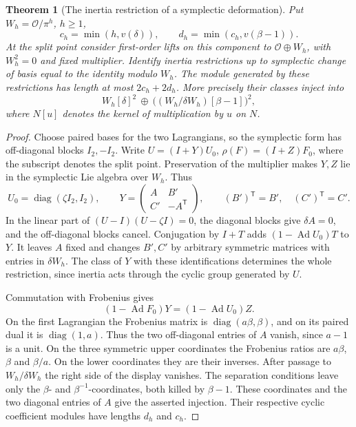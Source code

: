 \documentclass[a4paper,11pt]{article}
\newtheorem{theorem}[proposition]{Theorem}
\theoremstyle{definition}
\theoremstyle{remark}
\numberwithin{equation}{section}
\begin{document}
\begin{theorem}[The inertia restriction of a symplectic deformation]
\leavevmode\label{thm:symplocal655}
Put \(W_h=\mathcal O/\pi^h\), \(h\ge1\),
\[
 c_h=\min(h,v(\delta)),\qquad
 d_h=\min(c_h,v(\beta-1)).
\]
At the split point consider first-order lifts on this component
to \(\mathcal O\oplus W_h\), with \(W_h^2=0\) and fixed multiplier.
Identify inertia restrictions up to symplectic change of basis
equal to the identity modulo \(W_h\). The module generated by
these restrictions has length at most \(2c_h+2d_h\). More
precisely their classes inject into
\[
 W_h[\delta]^2\ \oplus\
       \big((W_h/\delta W_h)[\beta-1]\big)^2 ,
\]
where \(N[u]\) denotes the kernel of multiplication by \(u\) on \(N\).
\end{theorem}
\begin{proof}
Choose paired bases for the two Lagrangians, so the symplectic form
has off-diagonal blocks \(I_2,-I_2\). Write
\(U=(I+Y)U_0\), \(\rho(F)=(I+Z)F_0\), where the subscript denotes
the split point. Preservation of the multiplier makes \(Y,Z\)
lie in the symplectic Lie algebra over \(W_h\). Thus
\[
 U_0=\operatorname{diag}(\zeta I_2,I_2),\qquad
 Y=\begin{pmatrix} A&B'\\ C'&-A^{\mathsf T}\end{pmatrix},
 \qquad (B')^{\mathsf T}=B',\quad (C')^{\mathsf T}=C'.
\]
In the linear part of \((U-I)(U-\zeta I)=0\), the diagonal blocks
give \(\delta A=0\), and the off-diagonal blocks cancel. Conjugation
by \(I+T\) adds \((1-\operatorname{Ad}U_0)T\) to \(Y\).
It leaves \(A\) fixed and changes \(B',C'\) by arbitrary symmetric
matrices with entries in \(\delta W_h\). The class of \(Y\) with
these identifications determines the whole restriction, since
inertia acts through the cyclic group generated by \(U\).

Commutation with Frobenius gives
\[
  (1-\operatorname{Ad}F_0)Y=(1-\operatorname{Ad}U_0)Z .
\]
On the first Lagrangian the Frobenius matrix is
\(\operatorname{diag}(a\beta,\beta)\), and on its paired dual
it is \(\operatorname{diag}(1,a)\). Thus the two off-diagonal
entries of \(A\) vanish, since \(a-1\) is a unit. On the three
symmetric upper coordinates the Frobenius ratios are \(a\beta\),
\(\beta\) and \(\beta/a\). On the lower coordinates they are their
inverses. After passage to \(W_h/\delta W_h\) the right side of the
display vanishes. The separation conditions leave only the
\(\beta\)- and \(\beta^{-1}\)-coordinates, both killed by \(\beta-1\).
These coordinates and the two diagonal entries of \(A\) give the
asserted injection. Their respective cyclic coefficient modules
have lengths \(d_h\) and \(c_h\).
\end{proof}
\end{document}

